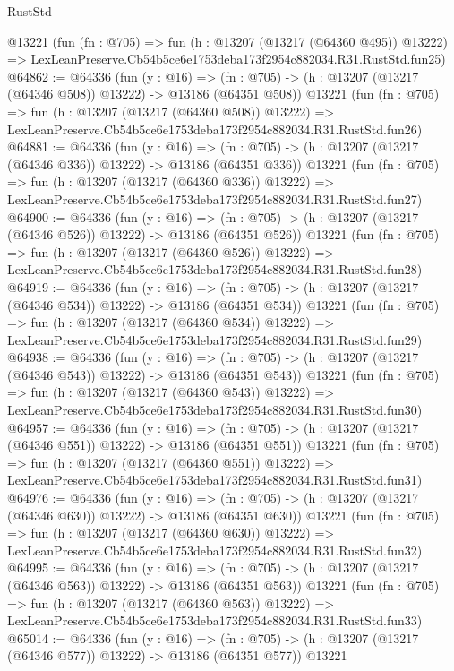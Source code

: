 \begin{lexlean}{RustStd}
\begin{coremodule}
    @13221
    (fun (fn : @705) =>
    fun (h : @13207 (@13217 (@64360 @495)) @13222) =>
    LexLeanPreserve.Cb54b5ce6e1753deba173f2954c882034.R31.RustStd.fun25)
@64862 := @64336
    (fun (y : @16) =>
    (fn : @705) -> (h : @13207 (@13217 (@64346 @508)) @13222) -> @13186 (@64351 @508))
    @13221
    (fun (fn : @705) =>
    fun (h : @13207 (@13217 (@64360 @508)) @13222) =>
    LexLeanPreserve.Cb54b5ce6e1753deba173f2954c882034.R31.RustStd.fun26)
@64881 := @64336
    (fun (y : @16) =>
    (fn : @705) -> (h : @13207 (@13217 (@64346 @336)) @13222) -> @13186 (@64351 @336))
    @13221
    (fun (fn : @705) =>
    fun (h : @13207 (@13217 (@64360 @336)) @13222) =>
    LexLeanPreserve.Cb54b5ce6e1753deba173f2954c882034.R31.RustStd.fun27)
@64900 := @64336
    (fun (y : @16) =>
    (fn : @705) -> (h : @13207 (@13217 (@64346 @526)) @13222) -> @13186 (@64351 @526))
    @13221
    (fun (fn : @705) =>
    fun (h : @13207 (@13217 (@64360 @526)) @13222) =>
    LexLeanPreserve.Cb54b5ce6e1753deba173f2954c882034.R31.RustStd.fun28)
@64919 := @64336
    (fun (y : @16) =>
    (fn : @705) -> (h : @13207 (@13217 (@64346 @534)) @13222) -> @13186 (@64351 @534))
    @13221
    (fun (fn : @705) =>
    fun (h : @13207 (@13217 (@64360 @534)) @13222) =>
    LexLeanPreserve.Cb54b5ce6e1753deba173f2954c882034.R31.RustStd.fun29)
@64938 := @64336
    (fun (y : @16) =>
    (fn : @705) -> (h : @13207 (@13217 (@64346 @543)) @13222) -> @13186 (@64351 @543))
    @13221
    (fun (fn : @705) =>
    fun (h : @13207 (@13217 (@64360 @543)) @13222) =>
    LexLeanPreserve.Cb54b5ce6e1753deba173f2954c882034.R31.RustStd.fun30)
@64957 := @64336
    (fun (y : @16) =>
    (fn : @705) -> (h : @13207 (@13217 (@64346 @551)) @13222) -> @13186 (@64351 @551))
    @13221
    (fun (fn : @705) =>
    fun (h : @13207 (@13217 (@64360 @551)) @13222) =>
    LexLeanPreserve.Cb54b5ce6e1753deba173f2954c882034.R31.RustStd.fun31)
@64976 := @64336
    (fun (y : @16) =>
    (fn : @705) -> (h : @13207 (@13217 (@64346 @630)) @13222) -> @13186 (@64351 @630))
    @13221
    (fun (fn : @705) =>
    fun (h : @13207 (@13217 (@64360 @630)) @13222) =>
    LexLeanPreserve.Cb54b5ce6e1753deba173f2954c882034.R31.RustStd.fun32)
@64995 := @64336
    (fun (y : @16) =>
    (fn : @705) -> (h : @13207 (@13217 (@64346 @563)) @13222) -> @13186 (@64351 @563))
    @13221
    (fun (fn : @705) =>
    fun (h : @13207 (@13217 (@64360 @563)) @13222) =>
    LexLeanPreserve.Cb54b5ce6e1753deba173f2954c882034.R31.RustStd.fun33)
@65014 := @64336
    (fun (y : @16) =>
    (fn : @705) -> (h : @13207 (@13217 (@64346 @577)) @13222) -> @13186 (@64351 @577))
    @13221

\end{coremodule}
\end{lexlean}
